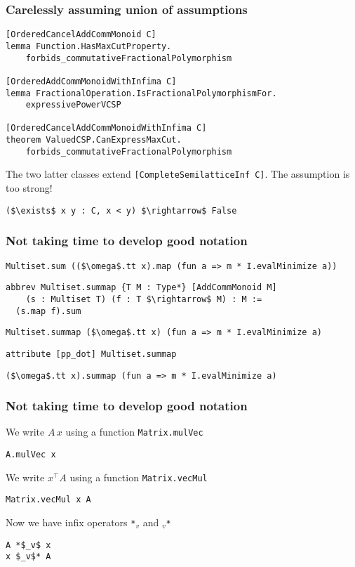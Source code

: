 \documentclass{beamer}
\begin{document}
\begin{frame}[fragile]
\frametitle{Carelessly assuming union of assumptions}
\begin{lstlisting}[basicstyle=\footnotesize\ttfamily]
[OrderedCancelAddCommMonoid C]
lemma Function.HasMaxCutProperty.
    forbids_commutativeFractionalPolymorphism

[OrderedAddCommMonoidWithInfima C]
lemma FractionalOperation.IsFractionalPolymorphismFor.
    expressivePowerVCSP

[OrderedCancelAddCommMonoidWithInfima C]
theorem ValuedCSP.CanExpressMaxCut.
    forbids_commutativeFractionalPolymorphism
\end{lstlisting}
The two latter classes extend \texttt{[CompleteSemilatticeInf C]}.
\pause
The assumption is too strong!
\begin{lstlisting}
($\exists$ x y : C, x < y) $\rightarrow$ False
\end{lstlisting}
\end{frame}

\begin{frame}[fragile]
\frametitle{Not taking time to develop good notation}
\begin{lstlisting}[basicstyle=\footnotesize\ttfamily]
Multiset.sum (($\omega$.tt x).map (fun a => m * I.evalMinimize a))
\end{lstlisting}
\pause
\begin{lstlisting}[basicstyle=\footnotesize\ttfamily]
abbrev Multiset.summap {T M : Type*} [AddCommMonoid M]
    (s : Multiset T) (f : T $\rightarrow$ M) : M :=
  (s.map f).sum
\end{lstlisting}
\begin{lstlisting}[basicstyle=\footnotesize\ttfamily]
Multiset.summap ($\omega$.tt x) (fun a => m * I.evalMinimize a)
\end{lstlisting}
\pause
\begin{lstlisting}[basicstyle=\footnotesize\ttfamily]
attribute [pp_dot] Multiset.summap
\end{lstlisting}
\begin{lstlisting}[basicstyle=\footnotesize\ttfamily]
($\omega$.tt x).summap (fun a => m * I.evalMinimize a)
\end{lstlisting}
\end{frame}

\begin{frame}[fragile]
\frametitle{Not taking time to develop good notation}
We write $A\,x$ using a function \texttt{Matrix.mulVec}
\begin{lstlisting}
A.mulVec x
\end{lstlisting}
We write $x^\top\!A$ using a function \texttt{Matrix.vecMul}
\begin{lstlisting}
Matrix.vecMul x A
\end{lstlisting}
\pause
\bigskip
Now we have infix operators \texttt{*$_v$} and \texttt{$_v$*}
\begin{lstlisting}
A *$_v$ x
x $_v$* A
\end{lstlisting}
\end{frame}
\end{document}
